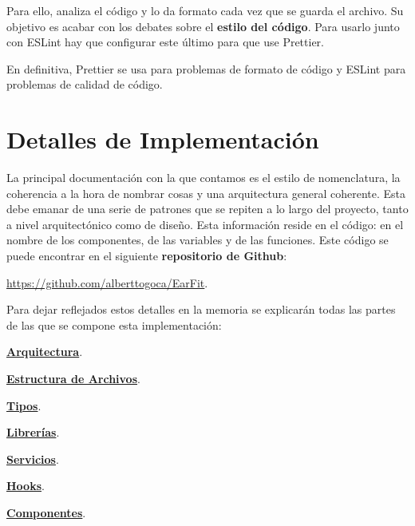 \documentclass[12pt,twoside,titlepage]{report}
\begin{document}
Para ello, analiza el código y lo da formato cada vez que se guarda el archivo. Su objetivo es acabar con los debates sobre el \textbf{estilo del código}. Para usarlo junto con ESLint hay que configurar este último para que use Prettier.

En definitiva, Prettier se usa para problemas de formato de código y ESLint para problemas de calidad de código.

\section{Detalles de Implementación}
\label{sec:implementacion}

La principal documentación con la que contamos es el estilo de nomenclatura, la coherencia a la hora de nombrar cosas y una arquitectura general coherente. Esta debe emanar de una serie de patrones que se repiten a lo largo del proyecto, tanto a nivel arquitectónico como de diseño. Esta información reside en el código: en el nombre de los componentes, de las variables y de las funciones. Este código se puede encontrar en el siguiente \textbf{repositorio de Github}: 

\url{https://github.com/alberttogoca/EarFit}.

Para dejar reflejados estos detalles en la memoria se explicarán todas las partes de las que se compone esta implementación:
\begin{compactitem} 
\item \hyperref[sec:arquitectura]{\textbf{Arquitectura}}. 
\item \hyperref[sec:archivos]{\textbf{Estructura de Archivos}}.
\item \hyperref[sec:tipos]{\textbf{Tipos}}.
\item \hyperref[sec:lib]{\textbf{Librerías}}.
\item \hyperref[sec:servicios]{\textbf{Servicios}}.
\item \hyperref[sec:Hooks]{\textbf{Hooks}}.
\item \hyperref[sec:componentes]{\textbf{Componentes}}.
\end{compactitem} 
\end{document}
